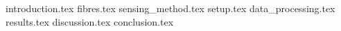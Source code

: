 \documentclass[engleski, times, utf8, diplomski, numeric]{fer}
\begin{document}
\sloppy

\maketitle

\izvornik

\zahvala{}

\tableofcontents

{introduction.tex}
{fibres.tex}
{sensing_method.tex}
{setup.tex}
{data_processing.tex}
{results.tex}
{discussion.tex}
{conclusion.tex}



\begin{abstract}


\keywords{}
\end{abstract}

\begin{sazetak}


\kljucnerijeci{}
\end{sazetak}
\end{document}

